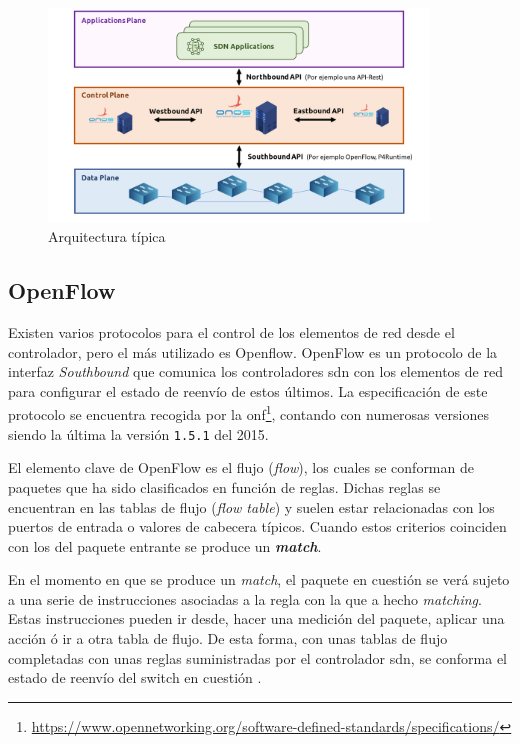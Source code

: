 \begin{figure}[ht]
    \centering
    \includegraphics[width=0.9\textwidth]{archivos/img/teoria/sdn_arch.png}
    \caption{Arquitectura típica  \cite{carrascal2020diseno}}
    \label{fig:sdnBasicArch}
\end{figure}

\subsection{OpenFlow}

Existen varios protocolos para el control de los elementos de red desde el controlador, pero el más utilizado es Openflow. OpenFlow es un protocolo de la interfaz \textit{Southbound} que comunica los controladores \gls{sdn} con los elementos de red para configurar el estado de reenvío de estos últimos. La especificación de este protocolo se encuentra recogida por la \gls{onf}\footnote{\url{https://www.opennetworking.org/software-defined-standards/specifications/}}, contando con numerosas versiones siendo la última la versión \texttt{1.5.1} del 2015. \\
\par

El elemento clave de OpenFlow es el flujo (\textit{flow}), los cuales se conforman de paquetes que ha sido clasificados en función de reglas. Dichas reglas se encuentran en las tablas de flujo (\textit{flow table}) y  suelen estar relacionadas con los puertos de entrada o valores de cabecera típicos. Cuando estos criterios coinciden con los del paquete entrante se produce un \textbf{\textit{match}}.\\
\par
En el momento en que se produce un \textit{match}, el paquete en cuestión se verá sujeto a una serie de instrucciones asociadas a la regla con la que a hecho \textit{matching}. Estas instrucciones pueden ir desde, hacer una medición del paquete, aplicar una acción ó ir a otra tabla de flujo. De esta forma, con unas tablas de flujo completadas con unas reglas suministradas por el controlador \gls{sdn}, se conforma el estado de reenvío del switch en cuestión \cite{nadeau2013sdn}. 
